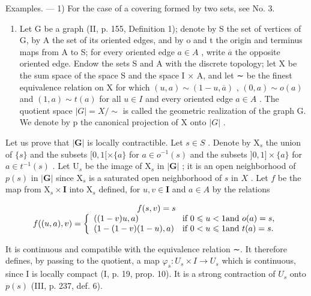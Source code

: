 Examples. --- 1) For the case of a covering formed by two sets, see No. 3.

\begin{enumerate}
\def\labelenumi{\arabic{enumi})}
\setcounter{enumi}{1}
\tightlist
\item
  Let G be a graph (II, p. 155, Definition 1); denote by S the set of vertices of G, by A the set of its oriented edges, and by o and t the origin and terminus maps from A to S; for every oriented edge \(a \in A\) , write \(\overline{a}\) the opposite oriented edge. Endow the sets S and A with the discrete topology; let X be the sum space of the space S and the space I × A, and let ∼ be the finest equivalence relation on X for which \((u, a) \sim (1 - u, \overline{a})\) , \((0, a) \sim o(a)\) and \((1, a) \sim t(a)\) for all \(u \in I\) and every oriented edge \(a \in A\) . The quotient space \(|G| = X / \sim\) is called the geometric realization of the graph G. We denote by p the canonical projection of X onto \(|G|\) .
\end{enumerate}

Let us prove that \(|\mathbf{G}|\) is locally contractible. Let \(s \in S\) . Denote by \(\mathrm{X}_s\) the union of \(\{s\}\) and the subsets \([0,1[ \times \{a\}\) for \(a \in o^{-1}(s)\) and the subsets \(]0,1] \times \{a\}\) for \(a \in t^{-1}(s)\) . Let \(\mathrm{U}_s\) be the image of \(\mathrm{X}_s\) in \(|\mathbf{G}|\) ; it is an open neighborhood of \(p(s)\) in \(|\mathbf{G}|\) since \(\mathrm{X}_s\) is a saturated open neighborhood of \(s\) in \(X\) . Let \(f\) be the map from \(\mathrm{X}_s \times \mathbf{I}\) into \(\mathrm{X}_s\) defined, for \(u, v \in \mathbf{I}\) and \(a \in A\) by the relations

\[
\begin{array}{c} f (s, v) = s \\ f ((u, a), v) = \left\{ \begin{array}{l l} ((1 - v) u, a) & \text {if } 0 \leqslant u <   1 \text {and } o (a) = s, \\ (1 - (1 - v) (1 - u), a) & \text {if } 0 <   u \leqslant 1 \text {and } t (a) = s. \end{array} \right. \end{array}
\]

It is continuous and compatible with the equivalence relation ∼. It therefore defines, by passing to the quotient, a map \(\varphi_{s}\colon U_{s}\times I\to U_{s}\) which is continuous, since I is locally compact (I, p. 19, prop. 10). It is a strong contraction of \(U_{s}\) onto \(p(s)\) (III, p. 237, def. 6).

